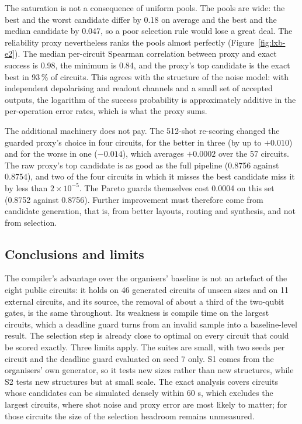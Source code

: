 The saturation is not a consequence of uniform pools. The pools are wide: the best and the worst candidate differ by 0.18 on average and the best and the median candidate by 0.047, so a poor selection rule would lose a great deal. The reliability proxy nevertheless ranks the pools almost perfectly (Figure~\ref{fig:lxb-e2}). The median per-circuit Spearman correlation between proxy and exact success is 0.98, the minimum is 0.84, and the proxy's top candidate is the exact best in 93\,\% of circuits. This agrees with the structure of the noise model: with independent depolarising and readout channels and a small set of accepted outputs, the logarithm of the success probability is approximately additive in the per-operation error rates, which is what the proxy sums.

The additional machinery does not pay. The 512-shot re-scoring changed the guarded proxy's choice in four circuits, for the better in three (by up to $+0.010$) and for the worse in one ($-0.014$), which averages $+0.0002$ over the 57 circuits. The raw proxy's top candidate is as good as the full pipeline (0.8756 against 0.8754), and two of the four circuits in which it misses the best candidate miss it by less than $2\times10^{-5}$. The Pareto guards themselves cost 0.0004 on this set (0.8752 against 0.8756). Further improvement must therefore come from candidate generation, that is, from better layouts, routing and synthesis, and not from selection.

\subsection{Conclusions and limits}

The compiler's advantage over the organisers' baseline is not an artefact of the eight public circuits: it holds on 46 generated circuits of unseen sizes and on 11 external circuits, and its source, the removal of about a third of the two-qubit gates, is the same throughout. Its weakness is compile time on the largest circuits, which a deadline guard turns from an invalid sample into a baseline-level result. The selection step is already close to optimal on every circuit that could be scored exactly. Three limits apply. The suites are small, with two seeds per circuit and the deadline guard evaluated on seed 7 only. S1 comes from the organisers' own generator, so it tests new sizes rather than new structures, while S2 tests new structures but at small scale. The exact analysis covers circuits whose candidates can be simulated densely within 60 s, which excludes the largest circuits, where shot noise and proxy error are most likely to matter; for those circuits the size of the selection headroom remains unmeasured.


